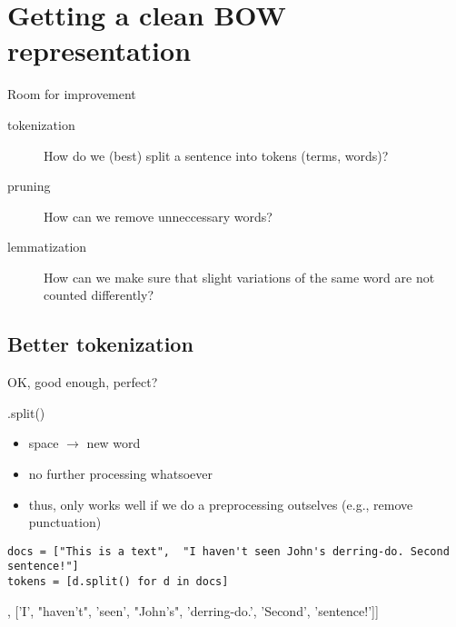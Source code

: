 \documentclass[compress]{beamer}
\begin{document}
\section{Getting a clean BOW representation}

\begin{frame}{Room for improvement}
\begin{description}
	\item[tokenization] How do we (best) split a sentence into tokens (terms, words)?
	\item[pruning] How can we remove unneccessary words?
	\item[lemmatization] How can we make sure that slight variations of the same word are not counted differently?

\end{description}
\end{frame}

\subsection{Better tokenization}

\begin{frame}[fragile]{OK, good enough, perfect?}
\begin{block}{.split()}
\begin{itemize}
	\item space $\rightarrow$ new word
	\item no further processing whatsoever
	\item thus, only works well if we do a preprocessing outselves (e.g., remove punctuation)
\end{itemize}
\end{block}
\begin{lstlisting}
docs = ["This is a text",  "I haven't seen John's derring-do. Second sentence!"]
tokens = [d.split() for d in docs]
\end{lstlisting}
\begin{lstlistingoutputtiny}
[['This', 'is', 'a', 'text'], ['I', "haven't", 'seen', "John's", 'derring-do.', 'Second', 'sentence!']]
\end{lstlistingoutputtiny}
\end{frame}
\end{document}
